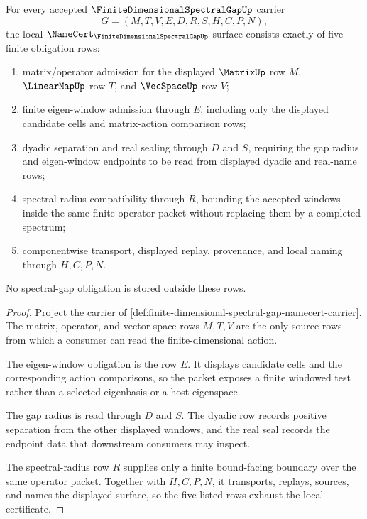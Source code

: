\begin{theorem}
\label{thm:finite-dimensional-spectral-gap-namecert-obligations}
For every accepted $\FiniteDimensionalSpectralGapUp$ carrier
$$
G=(M,T,V,E,D,R,S,H,C,P,N),
$$
the local $\NameCert_{\FiniteDimensionalSpectralGapUp}$ surface consists exactly of five finite obligation rows:
\begin{enumerate}
\item matrix/operator admission for the displayed $\MatrixUp$ row $M$, $\LinearMapUp$ row $T$, and $\VecSpaceUp$ row $V$;
\item finite eigen-window admission through $E$, including only the displayed candidate cells and matrix-action comparison rows;
\item dyadic separation and real sealing through $D$ and $S$, requiring the gap radius and eigen-window endpoints to be read from displayed dyadic and real-name rows;
\item spectral-radius compatibility through $R$, bounding the accepted windows inside the same finite operator packet without replacing them by a completed spectrum;
\item componentwise transport, displayed replay, provenance, and local naming through $H,C,P,N$.
\end{enumerate}
No spectral-gap obligation is stored outside these rows.
\end{theorem}
\begin{proof}
Project the carrier of \autoref{def:finite-dimensional-spectral-gap-namecert-carrier}. The matrix, operator, and vector-space rows $M,T,V$ are the only source rows from which a consumer can read the finite-dimensional action.

The eigen-window obligation is the row $E$. It displays candidate cells and the corresponding action comparisons, so the packet exposes a finite windowed test rather than a selected eigenbasis or a host eigenspace.

The gap radius is read through $D$ and $S$. The dyadic row records positive separation from the other displayed windows, and the real seal records the endpoint data that downstream consumers may inspect.

The spectral-radius row $R$ supplies only a finite bound-facing boundary over the same operator packet. Together with $H,C,P,N$, it transports, replays, sources, and names the displayed surface, so the five listed rows exhaust the local certificate.
\end{proof}

